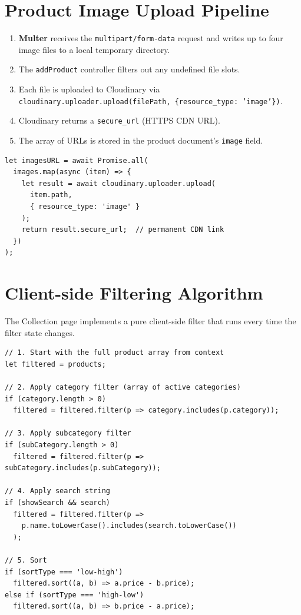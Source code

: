 \documentclass[12pt,a4paper]{report}
\begin{document}
\section{Product Image Upload Pipeline}

\begin{enumerate}[leftmargin=*]
  \item \textbf{Multer} receives the \texttt{multipart/form-data} request and writes up to four
        image files to a local temporary directory.
  \item The \texttt{addProduct} controller filters out any undefined file slots.
  \item Each file is uploaded to Cloudinary via
        \texttt{cloudinary.uploader.upload(filePath, \{resource\_type: 'image'\})}.
  \item Cloudinary returns a \texttt{secure\_url} (HTTPS CDN URL).
  \item The array of URLs is stored in the product document's \texttt{image} field.
\end{enumerate}

\begin{lstlisting}[caption={Parallel Cloudinary upload (productController.js)}, label=lst:cloudinary]
let imagesURL = await Promise.all(
  images.map(async (item) => {
    let result = await cloudinary.uploader.upload(
      item.path,
      { resource_type: 'image' }
    );
    return result.secure_url;  // permanent CDN link
  })
);
\end{lstlisting}

\section{Client-side Filtering Algorithm}

The Collection page implements a pure client-side filter that runs every time the
filter state changes.

\begin{lstlisting}[caption={Client-side product filter (Collection.jsx — pseudocode)},
                   label=lst:filter]
// 1. Start with the full product array from context
let filtered = products;

// 2. Apply category filter (array of active categories)
if (category.length > 0)
  filtered = filtered.filter(p => category.includes(p.category));

// 3. Apply subcategory filter
if (subCategory.length > 0)
  filtered = filtered.filter(p => subCategory.includes(p.subCategory));

// 4. Apply search string
if (showSearch && search)
  filtered = filtered.filter(p =>
    p.name.toLowerCase().includes(search.toLowerCase())
  );

// 5. Sort
if (sortType === 'low-high')
  filtered.sort((a, b) => a.price - b.price);
else if (sortType === 'high-low')
  filtered.sort((a, b) => b.price - a.price);
\end{lstlisting}
\end{document}
